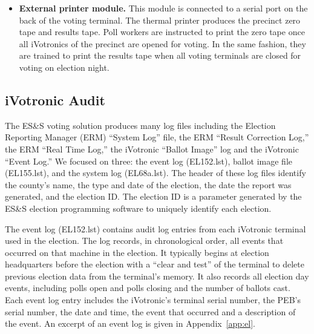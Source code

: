 \begin{itemize}
\item \textbf{External printer module.} This module is connected to a serial port on the back of the voting terminal. The thermal printer produces the precinct zero tape and results tape. Poll workers are instructed to print the zero tape once all iVotronics of the precinct are opened for voting. In the same fashion, they are trained to print the results tape when all voting terminals are closed for voting on election night.
\end{itemize}

\subsection{iVotronic Audit}
The ES\&S voting solution produces many log files including the Election Reporting Manager (ERM) \textquotedblleft System Log\textquotedblright \hspace{1 mm} file, the ERM \textquotedblleft Result Correction Log,\textquotedblright \hspace{1 mm} the ERM \textquotedblleft Real Time Log,\textquotedblright \hspace{1 mm} the iVotronic \textquotedblleft Ballot Image\textquotedblright \hspace{1 mm} log and the iVotronic \textquotedblleft Event Log.\textquotedblright \hspace{2 mm} We focused on three: the event log (EL152.lst), ballot image file (EL155.lst), and the system log (EL68a.lst).  The header of these log files identify the county's name, the type and date of the election, the date the report was generated, and the election ID. The election ID is a parameter generated by the ES\&S election programming software to uniquely identify each election. 
 
The event log (EL152.lst) contains audit log entries from each iVotronic terminal used in the election.  The log  records, in  chronological order, all events that occurred on that machine in the election. It typically begins at election headquarters before the election with a \textquotedblleft clear and test\textquotedblright \hspace{1 mm} of the terminal to delete previous election data from the terminal's memory. It also records all election day events, including polls open and polls closing and the number of ballots cast.  Each event log entry includes the iVotronic's terminal serial number, the PEB's serial number, the date and time, the event that occurred and a description of the event. An excerpt of  an event log is given in  Appendix~\ref{app:el}. 
 
